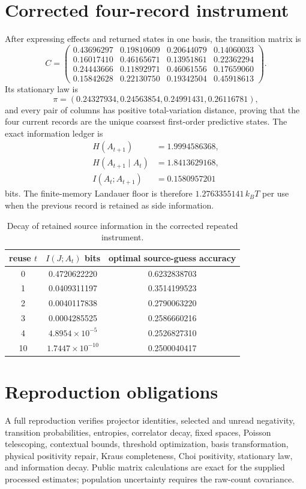 \documentclass[11pt,a4paper]{article}
\begin{document}
\section{Corrected four-record instrument}
After expressing effects and returned states in one basis, the transition matrix is
\begin{equation}
C=\begin{pmatrix}
0.43696297&0.19810609&0.20644079&0.14060033\\
0.16017410&0.46165671&0.13951861&0.22362294\\
0.24443666&0.11892971&0.46061556&0.17659060\\
0.15842628&0.22130750&0.19342504&0.45918613
\end{pmatrix}.
\end{equation}
Its stationary law is
\begin{equation}
\pi=(0.24327934,0.24563854,0.24991431,0.26116781),
\end{equation}
and every pair of columns has positive total-variation distance, proving that the four current records are the unique coarsest first-order predictive states. The exact information ledger is
\begin{align}
H(A_{t+1})&=1.9994586368,\\
H(A_{t+1}\mid A_t)&=1.8413629168,\\
I(A_t;A_{t+1})&=0.1580957201
\end{align}
 bits. The finite-memory Landauer floor is therefore $1.2763355141\,k_BT$ per use when the previous record is retained as side information.

\begin{table}[H]\centering
\caption{Decay of retained source information in the corrected repeated instrument.}
\begin{tabular}{ccc}
\toprule
reuse $t$&$I(J;A_t)$ bits&optimal source-guess accuracy\\\midrule
0&0.4720622220&0.6232838703\\
1&0.0409311197&0.3514199523\\
2&0.0040117838&0.2790063220\\
3&0.0004285525&0.2586660216\\
4&$4.8954\times10^{-5}$&0.2526827310\\
10&$1.7447\times10^{-10}$&0.2500040417\\
\bottomrule
\end{tabular}
\end{table}

\section{Reproduction obligations}
A full reproduction verifies projector identities, selected and unread negativity, transition probabilities, entropies, correlator decay, fixed spaces, Poisson telescoping, contextual bounds, threshold optimization, basis transformation, physical positivity repair, Kraus completeness, Choi positivity, stationary law, and information decay. Public matrix calculations are exact for the supplied processed estimates; population uncertainty requires the raw-count covariance.
\end{document}
